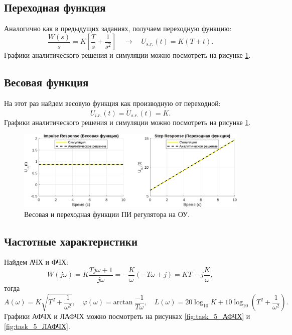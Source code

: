 \subsection{Переходная функция}

Аналогично как в предыдущих заданиях, получаем переходную функцию:
\begin{equation*}
    \frac{W(s)}{s}=K\left[ \frac{T}{s}+\frac{1}{s^2} \right] \quad\rightarrow\quad
    U_{s.r.}(t)=K(T+t).
\end{equation*}
Графики аналитического решения и симуляции можно посмотреть на рисунке \ref{fig:task_5_impl_step}.

\subsection{Весовая функция}

На этот раз найдем весовую функция как производную от переходной:
\begin{equation*}
    U_{i.r.}(t)=\dot U_{s.r.}(t)=K.
\end{equation*}
Графики аналитического решения и симуляции можно посмотреть на рисунке \ref{fig:task_5_impl_step}.

\begin{figure}[htbp]
    \centering
    \includegraphics[width=1\textwidth]{figs/task_5_impl_step.png}
    \caption{Весовая и переходная функции ПИ регулятора на ОУ.}
    \label{fig:task_5_impl_step}
\end{figure}

\subsection{Частотные характеристики}

Найдем АЧХ и ФЧХ:
\begin{equation*}
    W(j\omega)=K\frac{Tj\omega + 1}{j\omega}=-\frac{K}{\omega}(-T\omega+j)=KT-j\frac{K}{\omega},
\end{equation*}
тогда
\begin{equation*}
    A(\omega)=K\sqrt{T^2+\frac{1}{\omega^2}},\quad \varphi(\omega)=\text{arctan}\ \frac{-1}{T\omega}, \quad L(\omega)=20\log_{10}K+10\log_{10}\left(T^2+\frac{1}{\omega^2}\right).
\end{equation*}
Графики АФЧХ и ЛАФЧХ можно посмотреть на рисунках \ref{fig:task_5_АФЧХ} и \ref{fig:task_5_ЛАФЧХ}.

